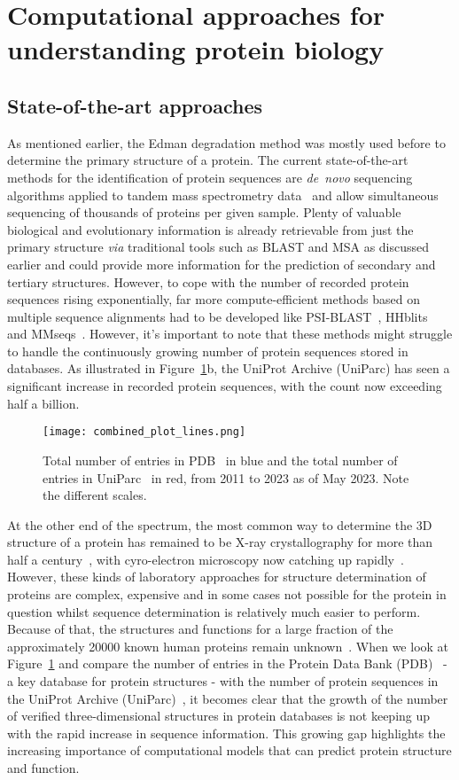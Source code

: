 \section{Computational approaches for understanding protein biology}
\subsection*{State-of-the-art approaches}
As mentioned earlier, the Edman degradation method was mostly used before to determine the primary structure of a protein. The current state-of-the-art methods for the identification of protein sequences are \mbox{\textit{de novo}} sequencing algorithms applied to tandem mass spectrometry data~\cite{protseq} and allow simultaneous sequencing of thousands of proteins per given sample. Plenty of valuable biological and evolutionary information is already retrievable from just the primary structure \textit{via} traditional tools such as BLAST and MSA as discussed earlier and could provide more information for the prediction of secondary and tertiary structures. However, to cope with the number of recorded protein sequences rising exponentially, far more compute-efficient methods based on multiple sequence alignments had to be developed like PSI-BLAST~\cite{psiblast}, HHblits~\cite{hhblits3} and MMseqs~\cite{mmseqs2}. However, it's important to note that these methods might struggle to handle the continuously growing number of protein sequences stored in databases. As illustrated in Figure~\ref{fig:pdb}b, the UniProt Archive (UniParc) has seen a significant increase in recorded protein sequences, with the count now exceeding half a billion.

\begin{figure}[t!]
    \centering
    \texttt{[image: combined\_plot\_lines.png]}
    \caption{Total number of entries in PDB~\cite{pdb} in blue and the total number of entries in UniParc~\cite{uniprot} in red, from 2011 to 2023 as of May 2023. Note the different scales.}
    \label{fig:pdb}
\end{figure}

At the other end of the spectrum, the most common way to determine the 3D structure of a protein has remained to be X-ray crystallography for more than half a century~\cite{xray}, with cyro-electron microscopy now catching up rapidly~\cite{cyroem}. However, these kinds of laboratory approaches for structure determination of proteins are complex, expensive and in some cases not possible for the protein in question whilst sequence determination is relatively much easier to perform. Because of that, the structures and functions for a large fraction of the approximately 20000 known human proteins remain unknown~\cite{coverage}. When we look at Figure~\ref{fig:pdb} and compare the number of entries in the Protein Data Bank (PDB)~\cite{pdb} - a key database for protein structures - with the number of protein sequences in the UniProt Archive (UniParc)~\cite{uniprot}, it becomes clear that the growth of the number of verified three-dimensional structures in protein databases is not keeping up with the rapid increase in sequence information. This growing gap highlights the increasing importance of computational models that can predict protein structure and function.

